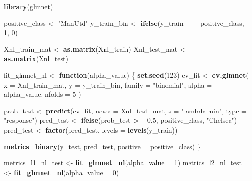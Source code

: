 \documentclass[
]{article}
\newenvironment{Shaded}{\begin{snugshade}}{\end{snugshade}}
\newcommand{\AttributeTok}[1]{\textcolor[rgb]{0.13,0.29,0.53}{#1}}
\newcommand{\ControlFlowTok}[1]{\textcolor[rgb]{0.13,0.29,0.53}{\textbf{#1}}}
\newcommand{\DecValTok}[1]{\textcolor[rgb]{0.00,0.00,0.81}{#1}}
\newcommand{\FloatTok}[1]{\textcolor[rgb]{0.00,0.00,0.81}{#1}}
\newcommand{\FunctionTok}[1]{\textcolor[rgb]{0.13,0.29,0.53}{\textbf{#1}}}
\newcommand{\NormalTok}[1]{#1}
\newcommand{\OtherTok}[1]{\textcolor[rgb]{0.56,0.35,0.01}{#1}}
\newcommand{\SpecialCharTok}[1]{\textcolor[rgb]{0.81,0.36,0.00}{\textbf{#1}}}
\newcommand{\StringTok}[1]{\textcolor[rgb]{0.31,0.60,0.02}{#1}}
\begin{document}
\begin{Shaded}
\begin{Highlighting}[]
\FunctionTok{library}\NormalTok{(glmnet)}

\NormalTok{positive\_class }\OtherTok{\textless{}{-}} \StringTok{"ManUtd"}
\NormalTok{y\_train\_bin }\OtherTok{\textless{}{-}} \FunctionTok{ifelse}\NormalTok{(y\_train }\SpecialCharTok{==}\NormalTok{ positive\_class, }\DecValTok{1}\NormalTok{, }\DecValTok{0}\NormalTok{)}

\NormalTok{Xnl\_train\_mat }\OtherTok{\textless{}{-}} \FunctionTok{as.matrix}\NormalTok{(Xnl\_train)}
\NormalTok{Xnl\_test\_mat  }\OtherTok{\textless{}{-}} \FunctionTok{as.matrix}\NormalTok{(Xnl\_test)}

\NormalTok{fit\_glmnet\_nl }\OtherTok{\textless{}{-}} \ControlFlowTok{function}\NormalTok{(alpha\_value) \{}
  \FunctionTok{set.seed}\NormalTok{(}\DecValTok{123}\NormalTok{)}
\NormalTok{  cv\_fit }\OtherTok{\textless{}{-}} \FunctionTok{cv.glmnet}\NormalTok{(}
    \AttributeTok{x =}\NormalTok{ Xnl\_train\_mat,}
    \AttributeTok{y =}\NormalTok{ y\_train\_bin,}
    \AttributeTok{family =} \StringTok{"binomial"}\NormalTok{,}
    \AttributeTok{alpha =}\NormalTok{ alpha\_value,}
    \AttributeTok{nfolds =} \DecValTok{5}
\NormalTok{  )}
  
\NormalTok{  prob\_test }\OtherTok{\textless{}{-}} \FunctionTok{predict}\NormalTok{(cv\_fit, }\AttributeTok{newx =}\NormalTok{ Xnl\_test\_mat, }\AttributeTok{s =} \StringTok{"lambda.min"}\NormalTok{, }\AttributeTok{type =} \StringTok{"response"}\NormalTok{)}
\NormalTok{  pred\_test }\OtherTok{\textless{}{-}} \FunctionTok{ifelse}\NormalTok{(prob\_test }\SpecialCharTok{\textgreater{}=} \FloatTok{0.5}\NormalTok{, positive\_class, }\StringTok{"Chelsea"}\NormalTok{)}
\NormalTok{  pred\_test }\OtherTok{\textless{}{-}} \FunctionTok{factor}\NormalTok{(pred\_test, }\AttributeTok{levels =} \FunctionTok{levels}\NormalTok{(y\_train))}
  
  \FunctionTok{metrics\_binary}\NormalTok{(y\_test, pred\_test, }\AttributeTok{positive =}\NormalTok{ positive\_class)}
\NormalTok{\}}

\NormalTok{metrics\_l1\_nl\_test }\OtherTok{\textless{}{-}} \FunctionTok{fit\_glmnet\_nl}\NormalTok{(}\AttributeTok{alpha\_value =} \DecValTok{1}\NormalTok{)  }
\NormalTok{metrics\_l2\_nl\_test }\OtherTok{\textless{}{-}} \FunctionTok{fit\_glmnet\_nl}\NormalTok{(}\AttributeTok{alpha\_value =} \DecValTok{0}\NormalTok{)}
\end{Highlighting}
\end{Shaded}
\end{document}
